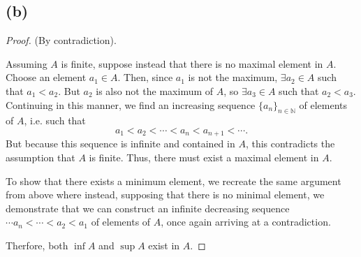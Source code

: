 \documentclass{article}
\begin{document}
\subsection*{(b)}
\begin{proof}
	(By contradiction).
	
	Assuming $A$ is finite, suppose instead that there is no maximal element in $A$. Choose an element $a_1 \in A$. Then, since $a_1$ is not the maximum, $\exists a_2 \in A$ such that $a_1 < a_2$. But $a_2$ is also not the maximum of $A$, so $\exists a_3 \in A$ such that $a_2 < a_3$. Continuing in this manner, we find an increasing sequence $\{a_n\}_{n\in\mathbb{N}}$ of elements of $A$, i.e. such that 
	\begin{equation}
		a_1 < a_2 < \cdots < a_n < a_{n+1} < \cdots.
	\end{equation}
	But because this sequence is infinite and contained in $A$, this contradicts the assumption that $A$ is finite. Thus, there must exist a maximal element in $A$. 
	
	To show that there exists a minimum element, we recreate the same argument from above where instead, supposing that there is no minimal element, we demonstrate that we can construct an infinite decreasing sequence \\$\cdots a_n < \cdots <a_2 < a_1$ of elements of $A$, once again arriving at a contradiction.
	
	Therfore, both $\inf{A}$ and $\sup{A}$ exist in $A$.
\end{proof}
	
\end{document}
